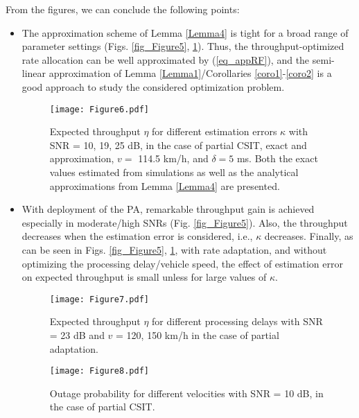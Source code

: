 From the figures, we can conclude the following points:
\begin{itemize}
    \item The approximation scheme of Lemma \ref{Lemma4} is tight for a broad range of parameter settings (Figs. \ref{fig_Figure5}, \ref{fig_Figure6}). Thus, the throughput-optimized rate allocation can be well approximated by (\ref{eq_appRF}), and the semi-linear approximation of Lemma \ref{Lemma1}/Corollaries \ref{coro1}-\ref{coro2} is a good approach to study the considered optimization problem.
    
\begin{figure}
\centering
  \texttt{[image: Figure6.pdf]}\\
\caption{Expected throughput $\eta$ for different estimation errors $\kappa$ with SNR = 10, 19, 25 dB, in the case of partial CSIT, exact and approximation,  $v = $  114.5 km/h, and $\delta = 5$ ms. Both the exact values estimated from simulations as well as the analytical approximations from Lemma \ref{Lemma4} are presented.}\label{fig_Figure6}
\end{figure}
    
    \item With deployment of the PA, remarkable throughput gain is achieved especially in moderate/high SNRs (Fig. \ref{fig_Figure5}). Also, the throughput decreases when the estimation error is considered, i.e., $\kappa$ decreases. Finally, as can be seen in Figs.  \ref{fig_Figure5}, \ref{fig_Figure6}, with rate adaptation,  and without optimizing the processing delay/vehicle speed, the effect of estimation error on expected throughput  is small unless for large values of $\kappa$.
    
\begin{figure}
\centering
  \texttt{[image: Figure7.pdf]}\\
\caption{Expected throughput $\eta$ for different processing delays with SNR = 23 dB and $v$ = 120, 150 km/h in the case of partial adaptation. }\label{fig_Figure7}

\end{figure}

\begin{figure}
\centering
  \texttt{[image: Figure8.pdf]}\\
\caption{Outage probability for different velocities with SNR = 10 dB, in the case of partial CSIT.}\label{fig_Figure8}


\end{figure}
\end{itemize}
